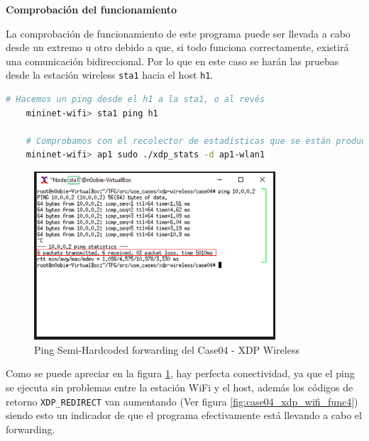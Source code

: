 \vspace{0.5cm}
\textbf{Comprobación del funcionamiento}\\
\par

La comprobación de funcionamiento de este programa puede ser llevada a cabo desde un extremo u otro debido a que, si todo funciona correctamente, existirá una comunicación bidireccional. Por lo que en este caso se harán las pruebas desde la estación wireless \texttt{sta1} hacia el host \texttt{h1}. 

\begin{lstlisting}[language= bash, style=Consola, caption={Comprobación del funcionamiento Semi-Hardcoded forwarding - Case04},label=code:case04_xdp_wifi_func2]
    # Hacemos un ping desde el h1 a la sta1, o al revés
    mininet-wifi> sta1 ping h1
    
    # Comprobamos con el recolector de estadísticas que se están produciendo XDP_REDIRECT
    mininet-wifi> ap1 sudo ./xdp_stats -d ap1-wlan1
\end{lstlisting}

\begin{figure}[ht!]
    \centering
    \includegraphics[width=9cm]{archivos/img/dev/xdp-wifi/case04/demo_case04_semihard_3_edited.png}
    \caption{Ping Semi-Hardcoded forwarding del Case04 - XDP Wireless}
    \label{fig:case04_xdp_wifi_func3}
\end{figure}

\vspace{0.5cm}

Como se puede apreciar en la figura \ref{fig:case04_xdp_wifi_func3}, hay perfecta conectividad, ya que el ping \hspace{1mm} se ejecuta sin problemas entre la estación WiFi y el host, además los códigos de retorno \texttt{XDP\_REDIRECT} van aumentando (Ver figura \ref{fig:case04_xdp_wifi_func4}) siendo esto un indicador de que el programa efectivamente está llevando a cabo el forwarding.

